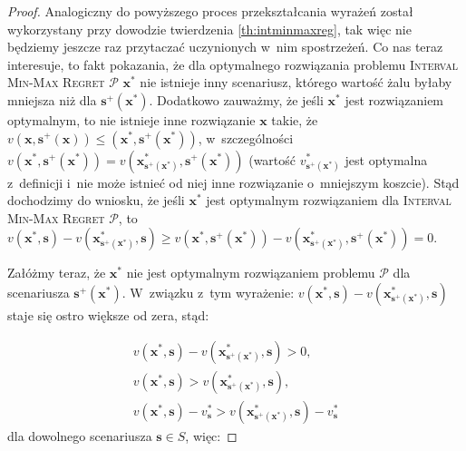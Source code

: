 \begin{proof}
	Analogiczny do powyższego proces przekształcania wyrażeń został wykorzystany przy dowodzie twierdzenia \ref{th:intminmaxreg}, tak więc nie będziemy jeszcze raz przytaczać uczynionych w~nim spostrzeżeń.
	Co nas teraz interesuje, to fakt pokazania, że dla optymalnego rozwiązania problemu \textsc{Interval Min-Max Regret $\mathcal{P}$} $\textbf{x}^{\ast}$ nie istnieje inny scenariusz, którego wartość żalu byłaby mniejsza niż dla $\textbf{s}^{+} \left( \textbf{x}^{\ast} \right)$.
	Dodatkowo zauważmy, że jeśli $\textbf{x}^{\ast}$ jest rozwiązaniem optymalnym, to nie istnieje inne rozwiązanie $\textbf{x}$ takie, że $v \left( \textbf{x}, \textbf{s}^{+} \left( \textbf{x} \right) \right) \leqslant \left( \textbf{x}^{\ast}, \textbf{s}^{+} \left( \textbf{x}^{\ast} \right) \right)$, w~szczególności $v \left( \textbf{x}^{\ast}, \textbf{s}^{+} \left( \textbf{x}^{\ast} \right) \right) = v \left( \textbf{x}^{\ast}_{\textbf{s}^{+} \left( \textbf{x}^{\ast} \right)}, \textbf{s}^{+} \left( \textbf{x}^{\ast} \right) \right)$ (wartość $v^{\ast}_{\textbf{s}^{+} \left( \textbf{x}^{\ast} \right)}$ jest optymalna z~definicji i~nie może istnieć od niej inne rozwiązanie o~mniejszym koszcie).
	Stąd dochodzimy do wniosku, że jeśli $\textbf{x}^{\ast}$ jest optymalnym rozwiązaniem dla \textsc{Interval Min-Max Regret $\mathcal{P}$}, to $v \left( \textbf{x}^{\ast}, \textbf{s} \right) - v \left( \textbf{x}^{\ast}_{\textbf{s}^{+} \left( \textbf{x}^{\ast} \right)}, \textbf{s} \right) \geqslant v \left( \textbf{x}^{\ast}, \textbf{s}^{+} \left( \textbf{x}^{\ast} \right) \right) - v \left( \textbf{x}^{\ast}_{\textbf{s}^{+} \left( \textbf{x}^{\ast} \right)}, \textbf{s}^{+} \left( \textbf{x}^{\ast} \right) \right) = 0$.
	
	Załóżmy teraz, że $\textbf{x}^{\ast}$ nie jest optymalnym rozwiązaniem problemu $\mathcal{P}$ dla scenariusza $\textbf{s}^{+} \left( \textbf{x}^{\ast} \right)$.
	W~związku z~tym wyrażenie: $v \left( \textbf{x}^{\ast}, \textbf{s} \right) - v \left( \textbf{x}^{\ast}_{\textbf{s}^{+} \left( \textbf{x}^{\ast} \right)}, \textbf{s} \right)$ staje się ostro większe od zera, stąd:
	
	\begin{gather*}
		v \left( \textbf{x}^{\ast}, \textbf{s} \right) - v \left( \textbf{x}^{\ast}_{\textbf{s}^{+} \left( \textbf{x}^{\ast} \right)}, \textbf{s} \right) > 0\text{,} \\
		v \left( \textbf{x}^{\ast}, \textbf{s} \right) > v \left( \textbf{x}^{\ast}_{\textbf{s}^{+} \left( \textbf{x}^{\ast} \right)}, \textbf{s} \right)\text{,} \\
		v \left( \textbf{x}^{\ast}, \textbf{s} \right) - v^{\ast}_{\textbf{s}} > v \left( \textbf{x}^{\ast}_{\textbf{s}^{+} \left( \textbf{x}^{\ast} \right)}, \textbf{s} \right) - v^{\ast}_{\textbf{s}}
	\end{gather*}
	dla dowolnego scenariusza $\textbf{s} \in S$, więc:
	

\end{proof}
